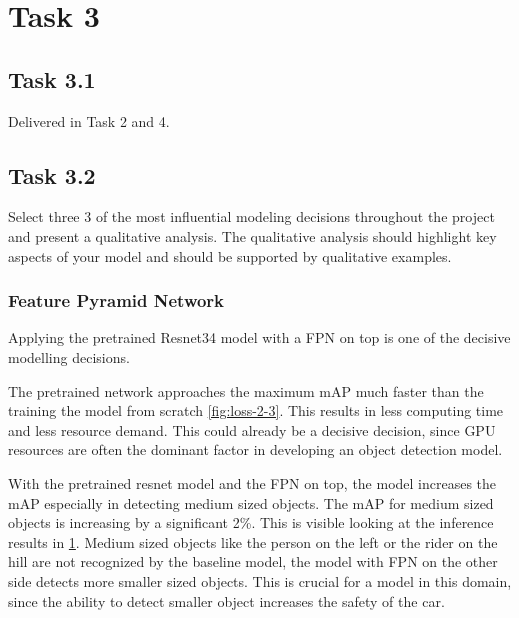 \documentclass{article}
\begin{document}
\newpage
\section*{Task 3}

\subsection*{Task 3.1}
Delivered in Task 2 and 4.

\subsection*{Task 3.2}
Select three 3 of the most influential modeling decisions throughout the project and present a qualitative analysis. The qualitative analysis should highlight key aspects of your model and should be supported by qualitative
examples.

\subsubsection*{Feature Pyramid Network}
Applying the pretrained Resnet34 model with a FPN on top is one of the decisive modelling decisions.

The pretrained network approaches the maximum mAP much faster than the training the model from scratch \ref{fig:loss-2-3}. This results in less computing time and less resource demand. This could already be a decisive decision, since GPU resources are often the dominant factor in developing an object detection model.

With the pretrained resnet model and the FPN on top, the model increases the mAP especially in detecting medium sized objects. The mAP for medium sized objects is increasing by a significant 2\%. This is visible looking at the inference results in \ref{fig:comparison1}. Medium sized objects like the person on the left or the rider on the hill are not recognized by the baseline model, the model with FPN on the other side detects more smaller sized objects. This is crucial for a model in this domain, since the ability to detect smaller object increases the safety of the car.

\begin{figure}[t!]
    \centering
    \label{fig:comparison1}
\end{figure}
\end{document}
